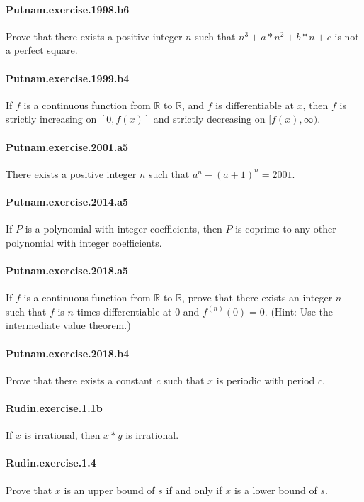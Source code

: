 \documentclass{article}
\begin{document}
\paragraph{Putnam.exercise.1998.b6} Prove that there exists a positive integer $n$ such that $n^3 + a*n^2 + b*n + c$ is not a perfect square.

\paragraph{Putnam.exercise.1999.b4} If $f$ is a continuous function from $\mathbb{R}$ to $\mathbb{R}$, and $f$ is differentiable at $x$, then $f$ is strictly increasing on $[0, f(x)]$ and strictly decreasing on $[f(x), \infty)$.

\paragraph{Putnam.exercise.2001.a5} There exists a positive integer $n$ such that $a^n - (a+1)^n = 2001$.

\paragraph{Putnam.exercise.2014.a5} If $P$ is a polynomial with integer coefficients, then $P$ is coprime to any other polynomial with integer coefficients.

\paragraph{Putnam.exercise.2018.a5} If $f$ is a continuous function from $\mathbb{R}$ to $\mathbb{R}$, prove that there exists an integer $n$ such that $f$ is $n$-times differentiable at $0$ and $f^{(n)}(0) = 0$. (Hint: Use the intermediate value theorem.)

\paragraph{Putnam.exercise.2018.b4} Prove that there exists a constant $c$ such that $x$ is periodic with period $c$.

\paragraph{Rudin.exercise.1.1b} If $x$ is irrational, then $x * y$ is irrational.

\paragraph{Rudin.exercise.1.4} Prove that $x$ is an upper bound of $s$ if and only if $x$ is a lower bound of $s$.
\end{document}
